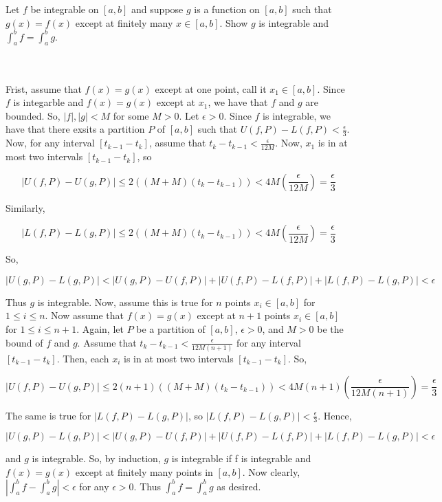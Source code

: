 Let $f$ be integrable on $[a,b]$ and suppose $g$ is a function on $[a,b]$ such that $g(x)=f(x)$ except
at finitely many $x\in[a,b]$. Show $g$ is integrable and $\int_a^bf=\int_a^bg$.\\\\

\begin{solution}\renewcommand{\qedsymbol}{}\ \\
    Frist, assume that $f(x)=g(x)$ except at one point, call it $x_1\in[a,b]$. Since $f$ is integarble
    and $f(x)=g(x)$ except at $x_1$, we have that $f$ and $g$ are bounded. So, $|f|, |g|<M$ for some
    $M>0$. Let $\epsilon>0$. Since $f$ is integrable, we have that there exsits a partition $P$ of
    $[a,b]$ such that $U(f,P)-L(f,P)<\frac{\epsilon}{3}$. Now, for any interval $[t_{k-1}-t_k]$, assume
    that $t_k-t_{k-1}<\frac{\epsilon}{12M}$. Now, $x_1$ is in at most two intervals $[t_{k-1}-t_k]$, so
    
    $$|U(f,P)-U(g,P)|\leq2((M+M)(t_k-t_{k-1}))<4M(\frac{\epsilon}{12M})=\frac{\epsilon}{3}$$
    
    Similarly,
    
    $$|L(f,P)-L(g,P)|\leq2((M+M)(t_k-t_{k-1}))<4M(\frac{\epsilon}{12M})=\frac{\epsilon}{3}$$
    
    So,
    
    $$|U(g,P)-L(g,P)|<|U(g,P)-U(f,P)|+|U(f,P)-L(f,P)|+|L(f,P)-L(g,P)|<\epsilon$$
    
    Thus $g$ is integrable. Now, assume this is true for $n$ points $x_i\in[a,b]$ for $1\leq i\leq n$.
    Now assume that $f(x)=g(x)$ except at $n+1$ points $x_i\in[a,b]$ for $1\leq i\leq n+1$. Again, let
    $P$ be a partition of $[a,b]$, $\epsilon>0$, and $M>0$ be the bound of $f$ and $g$. Assume that
    $t_k-t_{k-1}<\frac{\epsilon}{12M(n+1)}$ for any interval $[t_{k-1}-t_k]$. Then, each $x_i$ is in at
    most two intervals $[t_{k-1}-t_k]$. So,
    
    $$|U(f,P)-U(g,P)|\leq2(n+1)((M+M)(t_k-t_{k-1}))<4M(n+1)(\frac{\epsilon}{12M(n+1)})=
    \frac{\epsilon}{3}$$
    
    The same is true for $|L(f,P)-L(g,P)|$, so $|L(f,P)-L(g,P)|<\frac{\epsilon}{3}$. Hence,
    
    $$|U(g,P)-L(g,P)|<|U(g,P)-U(f,P)|+|U(f,P)-L(f,P)|+|L(f,P)-L(g,P)|<\epsilon$$
    
    and $g$ is integrable. So, by induction, $g$ is integrable if f is integrable and $f(x)=g(x)$ except
    at finitely many points in $[a,b]$. Now clearly, $|\int_a^bf-\int_a^bg|<\epsilon$ for any
    $\epsilon>0$. Thus $\int_a^bf=\int_a^bg$ as desired.

\end{solution}